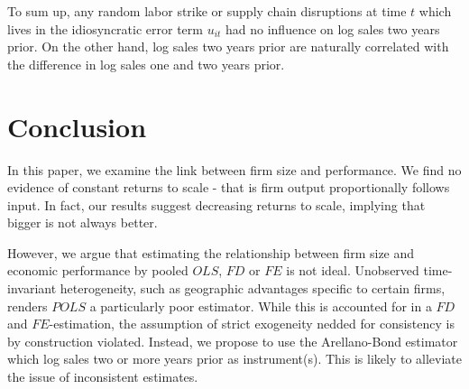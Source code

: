 \documentclass[11pt]{article}
\begin{document}
To sum up, any random labor strike or supply chain disruptions at time $t$ which lives in the idiosyncratic error term $u_{it}$ had no influence on log sales two years prior. On the other hand, log sales two years prior are naturally correlated with the difference in log sales one and two years prior.

\section{Conclusion}
In this paper, we examine the link between firm size and performance. We find no evidence of constant returns to scale - that is firm output proportionally follows input. In fact, our results suggest decreasing returns to scale, implying that bigger is not always better. 

However, we argue that estimating the relationship between firm size and economic performance by pooled $OLS$, $FD$ or $FE$ is not ideal. Unobserved time-invariant heterogeneity, such as geographic advantages specific to certain firms, renders $POLS$ a particularly poor estimator. While this is accounted for in a $FD$ and $FE$-estimation, the assumption of strict exogeneity nedded for consistency is by construction violated. Instead, we propose to use the Arellano-Bond estimator which log sales two or more years prior as instrument(s). This is likely to alleviate the issue of inconsistent estimates. 



\newpage
\begin{small}

\end{small}

\end{document}
